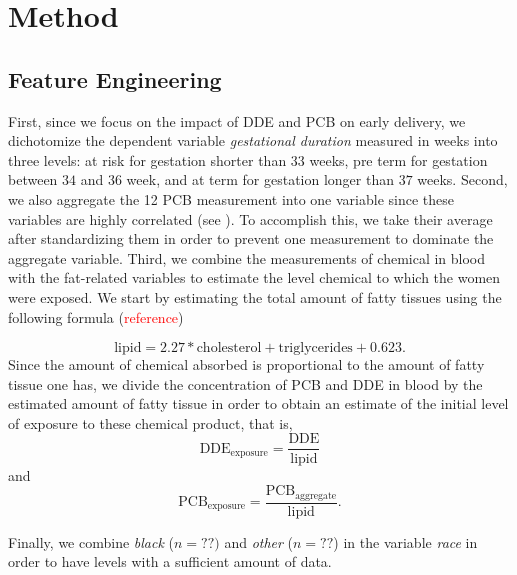 \documentclass[wcp]{jmlr}%
\newcommand\todo[1]{\textcolor{red}{#1}}
\begin{document}
\section{Method}
\label{sec:method}

\subsection{Feature Engineering}
First, since we focus on the impact of DDE and PCB on early delivery, we dichotomize the dependent variable \textit{gestational duration} measured in weeks into three levels: at risk for gestation shorter than $33$ weeks, pre term for gestation between $34$ and $36$ week, and at term for gestation longer than $37$ weeks. 
Second, we also aggregate the 12 PCB measurement into one variable since these variables are highly correlated (see ). To accomplish this, we take their average after standardizing them in order to prevent one measurement to dominate the aggregate variable. 
Third, we combine the measurements of chemical in blood with the fat-related variables to estimate the level chemical to which the women were exposed. We start by estimating the total amount of fatty tissues using the following formula (\todo{reference})

\begin{equation}
\label{eq:fat}
\text{lipid} = 2.27 * \text{cholesterol} + \text{triglycerides} + 0.623.
\end{equation}
Since the amount of chemical absorbed is proportional to the amount of fatty tissue one has, we divide the concentration of PCB and DDE in blood by the estimated amount of fatty tissue in order to obtain an estimate of the initial level of exposure to these chemical product, that is,
\begin{equation}
\label{eq:exp_dde}
\text{DDE}_{\text{exposure}} = \dfrac{\text{DDE}}{\text{lipid}}
\end{equation}
and 
\begin{equation}
\label{eq:exp_pcb}
\text{PCB}_{\text{exposure}} = \dfrac{\text{PCB}_\text{aggregate}}{\text{lipid}}.
\end{equation}

Finally, we combine \textit{black} ($n=??)$ and \textit{other} ($n=??$) in the variable \textit{race} in order to have levels with a sufficient amount of data.
\end{document}
